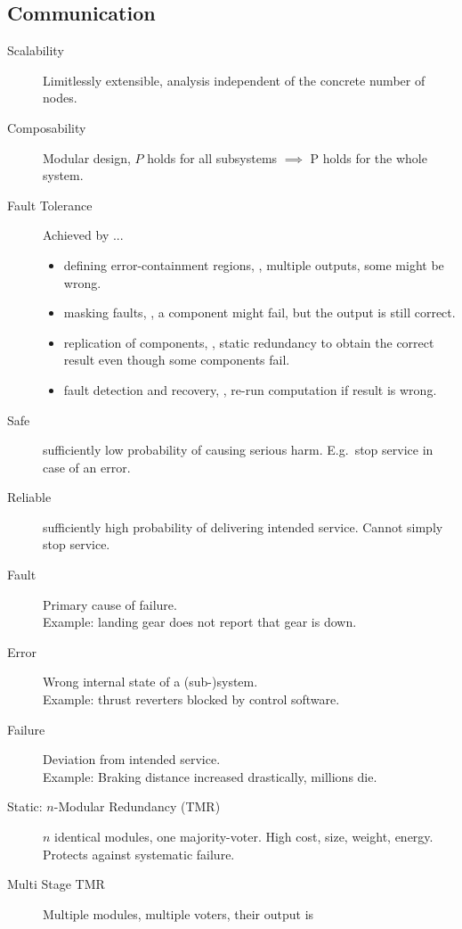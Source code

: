 \subsection{Communication}

\begin{description}
    \item[Scalability] Limitlessly extensible, analysis independent of the
    concrete number of nodes.
    \item[Composability] Modular design, $P$ holds for all subsystems $\implies$ 
    P holds for the whole system.
    \item[Fault Tolerance] Achieved by ...
        \begin{itemize}
            \item defining error-containment regions, \ie, multiple outputs,
            some might be wrong.
            \item masking faults, \ie, a component might fail, but the output is
            still correct.
            \item replication of components, \ie, static redundancy to obtain
            the correct result even though some components fail.
            \item fault detection and recovery, \ie, re-run computation if
            result is wrong.
        \end{itemize}
    \item[Safe] sufficiently low probability of causing serious harm. E.g.\ stop
    service in case of an error.
    \item[Reliable] sufficiently high probability of delivering intended
    service. Cannot simply stop service.
    \item[Fault] Primary cause of failure.\\
    Example: landing gear does not report that gear is down.
    \item[Error] Wrong internal state of a (sub-)system. \\
    Example: thrust reverters blocked by control software.
    \item[Failure] Deviation from intended service. \\
    Example: Braking distance increased drastically, millions die.
    \item[Static: $n$-Modular Redundancy (TMR)] $n$ identical modules, one
    majority-voter.
    High cost, size, weight, energy. Protects against systematic failure.
    \item[Multi Stage TMR] Multiple modules, multiple voters, their output is

\end{description}
